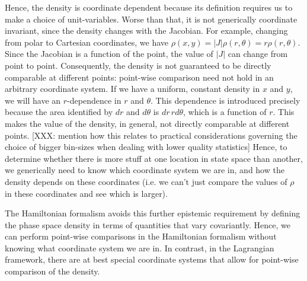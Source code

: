 \documentclass[letterpaper]{article}
\begin{document}
Hence, the density is coordinate dependent because its definition requires us to make a choice of unit-variables. Worse than that, it is not generically coordinate invariant, since the density changes with the Jacobian. For example, changing from polar to Cartesian coordinates, we have $\rho(x,y) = |J| \rho(r, \theta) = r \rho(r, \theta)$. Since the Jacobian is a function of the point, the value of $|J|$ can change from point to point. Consequently, the density is not guaranteed to be directly comparable at different points: point-wise comparison need not hold in an arbitrary coordinate system. If we have a uniform, constant density in $x$ and $y$, we will have an $r$-dependence in $r$ and $\theta$. This dependence is introduced precisely because the area identified by $dr$ and $d\theta$ is $dr \,r d\theta$, which is a function of $r$. This makes the value of the density, in general, not directly comparable at different points. [XXX: mention how this relates to practical considerations governing the choice of bigger bin-sizes when dealing with lower quality statistics] Hence, to determine whether there is more stuff at one location in state space than another, we generically need to know which coordinate system we are in, and how the density depends on these coordinates (i.e. we can't just compare the values of $\rho$ in these coordinates and see which is larger). 

The Hamiltonian formalism avoids this further epistemic requirement by defining the phase space density in terms of quantities that vary covariantly. Hence, we can perform point-wise comparisons in the Hamiltonian formalism without knowing what coordinate system we are in. In contrast, in the Lagrangian framework, there are at best special coordinate systems that allow for point-wise comparison of the density.
\end{document}
